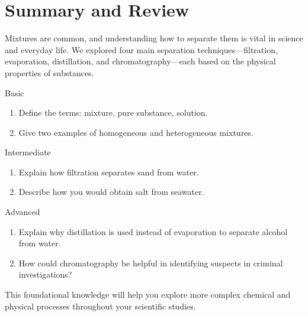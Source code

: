 \section{Summary and Review}

Mixtures are common, and understanding how to separate them is vital in science and everyday life. We explored four main separation techniques—filtration, evaporation, distillation, and chromatography—each based on the physical properties of substances.

\begin{tieredquestions}{Basic}
\begin{enumerate}
\item Define the terms: mixture, pure substance, solution.
\item Give two examples of homogeneous and heterogeneous mixtures.
\end{enumerate}
\end{tieredquestions}

\begin{tieredquestions}{Intermediate}
\begin{enumerate}
\item Explain how filtration separates sand from water.
\item Describe how you would obtain salt from seawater.
\end{enumerate}
\end{tieredquestions}

\begin{tieredquestions}{Advanced}
\begin{enumerate}
\item Explain why distillation is used instead of evaporation to separate alcohol from water.
\item How could chromatography be helpful in identifying suspects in criminal investigations?
\end{enumerate}
\end{tieredquestions}

This foundational knowledge will help you explore more complex chemical and physical processes throughout your scientific studies.